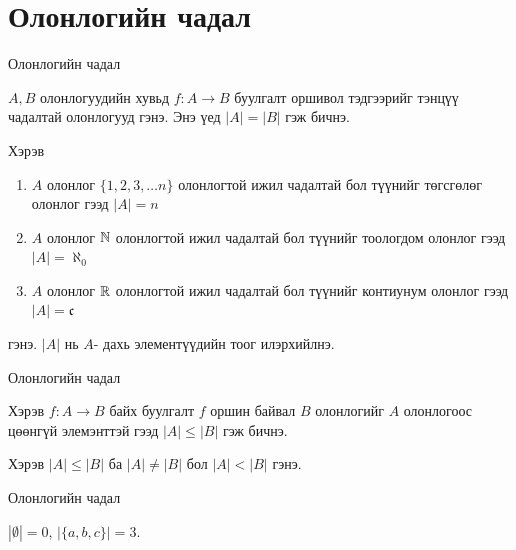\section{Олонлогийн чадал}
\begin{frame}[allowframebreaks]{Олонлогийн чадал}
\begin{definition}
$A,B$ олонлогуудийн хувьд $f:A\to B$  буулгалт оршивол тэдгээрийг тэнцүү чадалтай олонлогууд гэнэ. Энэ үед $|A|=|B|$ гэж бичнэ. 


Хэрэв 
\begin{enumerate}
    \item $A$ олонлог $\{1, 2, 3, \ldots n\}$ олонлогтой ижил чадалтай бол түүнийг төгсгөлөг олонлог гээд $|A|=n$
    \item $A$ олонлог $\mathbb{N}$ олонлогтой ижил чадалтай бол түүнийг тоологдом олонлог гээд $|A|=\aleph_0$
    \item $A$ олонлог $\mathbb{R}$ олонлогтой ижил чадалтай бол түүнийг контиунум олонлог гээд $|A|=\mathfrak{c}$
\end{enumerate} гэнэ. $|A|$ нь $A$- дахь элементүүдийн тоог илэрхийлнэ.
\end{definition}
\end{frame}

\begin{frame}[allowframebreaks]{Олонлогийн чадал}
\begin{definition}
Хэрэв $f:A\to B$ байх  буулгалт $f$ оршин байвал $B$ олонлогийг $A$ олонлогоос цөөнгүй элемэнттэй гээд $|A|\le |B|$ гэж бичнэ.

Хэрэв $|A|\le |B|$ ба $|A|\ne |B|$ бол  $|A|<|B|$ гэнэ.
\end{definition}
\end{frame}

\begin{frame}[allowframebreaks]{Олонлогийн чадал}
\begin{example}
 $|\emptyset|=0$, \quad $|\{a,b,c\}|=3$.
\end{example}
\end{frame}

